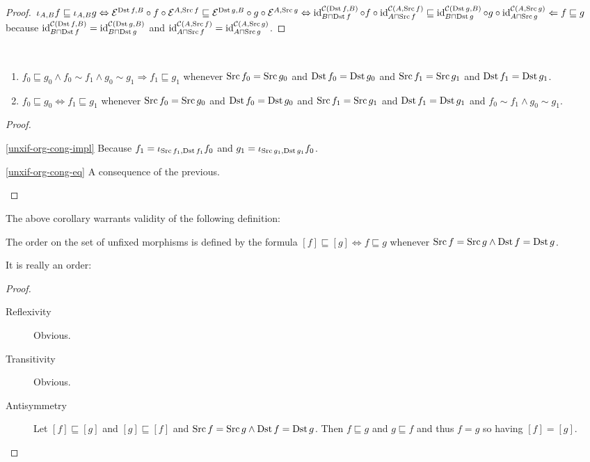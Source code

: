 \begin{proof}
$\iota_{A,B}f\sqsubseteq\iota_{A,B}g \Leftrightarrow
\mathcal{E}^{\operatorname{Dst} f,B}\circ f\circ\mathcal{E}^{A,\operatorname{Src} f}
\sqsubseteq
\mathcal{E}^{\operatorname{Dst} g,B}\circ g\circ\mathcal{E}^{A,\operatorname{Src} g}
\Leftrightarrow
\operatorname{id}^{\mathcal{C}(\operatorname{Dst} f,B)}_{B\sqcap\operatorname{Dst} f}\circ f\circ\operatorname{id}^{\mathcal{C}(A,\operatorname{Src} f)}_{A\sqcap\operatorname{Src} f}
\sqsubseteq
\operatorname{id}^{\mathcal{C}(\operatorname{Dst} g,B)}_{B\sqcap\operatorname{Dst} g}\circ g\circ\operatorname{id}^{\mathcal{C}(A,\operatorname{Src} g)}_{A\sqcap\operatorname{Src} g}
\Leftarrow f\sqsubseteq g$ because
$\operatorname{id}^{\mathcal{C}(\operatorname{Dst} f,B)}_{B\sqcap\operatorname{Dst} f}=
\operatorname{id}^{\mathcal{C}(\operatorname{Dst} g,B)}_{B\sqcap\operatorname{Dst} g}$ and
$\operatorname{id}^{\mathcal{C}(A,\operatorname{Src} f)}_{A\sqcap\operatorname{Src} f}=
\operatorname{id}^{\mathcal{C}(A,\operatorname{Src} g)}_{A\sqcap\operatorname{Src} g}$.
\end{proof}

\begin{cor}\label{unxif-org-cong}
~
\begin{enumerate}
\item\label{unxif-org-cong-impl}
$f_0\sqsubseteq g_0\land f_0\sim f_1\land g_0\sim g_1
\Rightarrow f_1\sqsubseteq g_1$ whenever
$\operatorname{Src} f_0=\operatorname{Src} g_0$ and $\operatorname{Dst} f_0=\operatorname{Dst} g_0$ and
$\operatorname{Src} f_1=\operatorname{Src} g_1$ and $\operatorname{Dst} f_1=\operatorname{Dst} g_1$.
\item\label{unxif-org-cong-eq}
$f_0\sqsubseteq g_0\Leftrightarrow f_1\sqsubseteq g_1$ whenever
$\operatorname{Src} f_0=\operatorname{Src} g_0$ and $\operatorname{Dst} f_0=\operatorname{Dst} g_0$ and
$\operatorname{Src} f_1=\operatorname{Src} g_1$ and $\operatorname{Dst} f_1=\operatorname{Dst} g_1$ and
$f_0\sim f_1\land g_0\sim g_1$.
\end{enumerate}
\end{cor}

\begin{proof}
~
\begin{disorder}
\item[\ref{unxif-org-cong-impl}] Because
$f_1=\iota_{\operatorname{Src} f_1,\operatorname{Dst} f_1}f_0$ and
$g_1=\iota_{\operatorname{Src} g_1,\operatorname{Dst} g_1}f_0$.
\item[\ref{unxif-org-cong-eq}] A consequence of the
previous.
\end{disorder}
\end{proof}

The above corollary warrants validity of the following
definition:

\begin{defn}
The order on the set of unfixed morphisms is defined
by the formula
$[f]\sqsubseteq[g]\Leftrightarrow f\sqsubseteq g$
whenever $\operatorname{Src} f=\operatorname{Src} g\land\operatorname{Dst} f=\operatorname{Dst} g$.
\end{defn}

It is really an order:

\begin{proof}
~
\begin{description}
\item[Reflexivity] Obvious.
\item[Transitivity] Obvious.
\item[Antisymmetry] Let $[f]\sqsubseteq[g]$ and
$[g]\sqsubseteq[f]$ and $\operatorname{Src} f=\operatorname{Src} g\land\operatorname{Dst} f=\operatorname{Dst} g$.
Then $f\sqsubseteq g$ and $g\sqsubseteq f$ and thus
$f=g$ so having $[f]=[g]$.
\end{description}
\end{proof}

